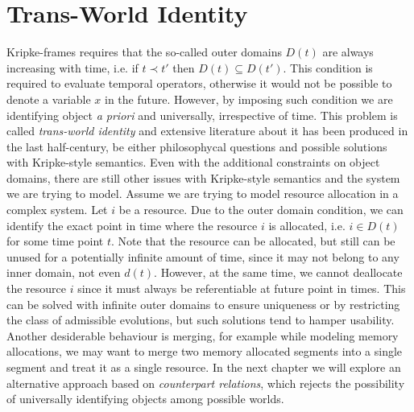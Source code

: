 \section{Trans-World Identity}
Kripke-frames requires that the so-called outer domains $D(t)$ are always increasing with time, i.e. if $t \prec t'$
then $D(t) \subseteq D(t')$. This condition is required to evaluate temporal operators, otherwise it would not be
possible to denote a variable $x$ in the future.
However, by imposing such condition we are identifying object \emph{a priori} and universally, irrespective of
time. This problem is called \emph{trans-world identity} and extensive literature about it has been produced in the last
half-century, be either philosophycal questions and possible solutions with Kripke-style semantics.
Even with the additional constraints on object domains, there are still other issues with Kripke-style semantics and the
system we are trying to model. Assume we are trying to model resource allocation in a complex system. Let $i$ be a
resource. Due to the outer domain condition, we can identify the exact point in time where the resource $i$ is
allocated, i.e. $i \in D(t)$ for some time point $t$. Note that the resource can be allocated, but still can be unused
for a potentially infinite amount of time, since it may not belong to any inner domain, not even $d(t)$. However, at the
same time, we cannot deallocate the resource $i$ since it must always be referentiable at future point in times. This
can be solved with infinite outer domains to ensure uniqueness or by restricting the class of admissible evolutions, but
such solutions tend to hamper usability. Another desiderable behaviour is merging, for example while
modeling memory allocations, we may want to merge two memory allocated segments into a single segment and treat it as a
single resource.
In the next chapter we will explore an alternative approach based on \emph{counterpart relations}, which rejects the
possibility of universally identifying objects among possible worlds.
